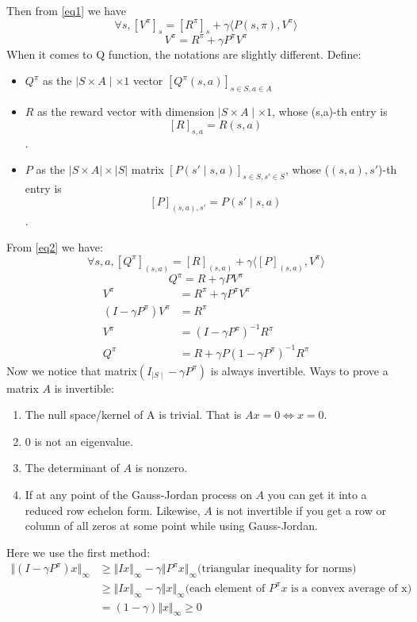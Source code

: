 \documentclass{report}
\begin{document}
Then from \ref{eq1} we have
\begin{equation}
    \forall s, [V^{\pi}]_s=[R^{\pi}]_s+\gamma \langle P(s,\pi),V^{\pi}\rangle
\end{equation}
\[
V^{\pi} =  R^{\pi}+\gamma P^{\pi}V^{\pi}
\]
When it comes to Q function, the notations are slightly different. Define:
\begin{itemize}
    \item $Q^{\pi}$ as the $\mid S \times A \mid \times 1$ vector $[Q^{\pi}(s,a)]_{s\in S,a\in 
 A}$
    \item $R$ as the reward vector with dimension $\mid S \times A \mid \times 1$, whose (s,a)-th entry is \[[R]_{s,a}=R(s,a)\]. 
    \item $P$ as the $|S \times A|\times |S|$ matrix $[P(s'\mid s,a)]_{s\in S,s'\in S}$, whose ($(s,a),s'$)-th entry is \[[P]_{(s,a),s'}=P(s'\mid s,a)\]. 
\end{itemize}
From \ref{eq2} we have:
\begin{equation}
    \forall s,a, [Q^{\pi}]_{(s,a)}=[R]_{(s,a)}+\gamma \langle [P]_{(s,a)}, V^{\pi}\rangle
\end{equation}
\[
Q^{\pi}=R+\gamma PV^{\pi}
\]
\begin{align*}
V^{\pi} &=  R^{\pi}+\gamma P^{\pi}V^{\pi} \\ 
(I-\gamma P^{\pi})V^{\pi} &=  R^{\pi} \\
V^{\pi} &= (I-\gamma P^{\pi})^{-1}R^{\pi} \\
Q^{\pi}&=R+\gamma P(1-\gamma P^{\pi})^{-1}R^{\pi}
\end{align*}   
Now we notice that matrix$(I_{\mid S \mid}-\gamma P^{\pi})$ is always invertible.  
Ways to prove a matrix $A$ is invertible:
\begin{enumerate}
    \item The null space/kernel of  A  is trivial. That is $Ax=0 \iff x=0$.
    \item $0$ is not an eigenvalue.
    \item The determinant of $A$ is nonzero.
    \item If at any point of the Gauss-Jordan process on $A$ you can get it into a reduced row echelon form. Likewise,  $A$ is not invertible if you get a row or column of all zeros at some point while using Gauss-Jordan.
\end{enumerate}
Here we use the first method:
\begin{equation}
\begin{split}
    \Vert(I-\gamma P^{\pi})x\Vert_{\infty}
    &\geq \Vert Ix \Vert_{\infty} -\gamma \Vert P^{\pi} x \Vert_{\infty} \text{(triangular inequality for norms)} \\
    &\geq \Vert Ix \Vert_{\infty} - \gamma \Vert x \Vert_{\infty} \text{(each element of $P^{\pi}x$ is a convex average of x)} \\
   & = (1-\gamma)\Vert x \Vert_{\infty} \geq 0
\end{split}
\end{equation}
\end{document}
